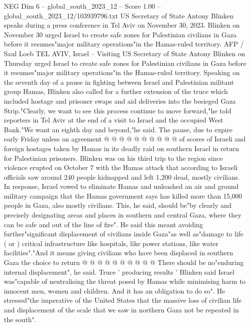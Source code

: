 \begin{textsample}{NEG Dim 6 – global\_south\_2023\_12 – Score 1.00 – global\_south\_2023\_12/103939796.txt}  \label{ex:f6_neg_317}
US Secretary of State Antony Blinken speaks during a press conference in Tel Aviv on November 30, 2023.
Blinken on November 30 urged Israel to create safe zones for Palestinian civilians in Gaza before it resumes"major military operations"in the Hamas-ruled territory.
AFP / Saul Loeb TEL AVIV, Israel -- Visiting US Secretary of State Antony Blinken on Thursday urged Israel to create safe zones for Palestinian civilians in Gaza before it resumes"major military operations"in the Hamas-ruled territory.
Speaking on the seventh day of a pause in fighting between Israel and Palestinian militant group Hamas, Blinken also called for a further extension of the truce which included hostage and prisoner swaps and aid deliveries into the besieged Gaza Strip."Clearly, we want to see this process continue to move forward,"he told reporters in Tel Aviv at the end of a visit to Israel and the occupied West Bank."We want an eighth day and beyond,"he said.
The pause, due to expire early Friday unless an agreement @ @ @ @ @ @ @ @ @ @ of scores of Israeli and foreign hostages taken by Hamas in its deadly raid on southern Israel in return for Palestinian prisoners.
Blinken was on his third trip to the region since violence erupted on October 7 with the Hamas attack that according to Israeli officials saw around 240 people kidnapped and left 1,200 dead, mostly civilians.
In response, Israel vowed to eliminate Hamas and unleashed an air and ground military campaign that the Hamas government says has killed more than 15,000 people in Gaza, also mostly civilians.
This, he said, should be"by clearly and precisely designating areas and places in southern and central Gaza, where they can be safe and out of the line of fire".
He said this meant avoiding further"significant displacement of civilians inside Gaza"as well as"damage to life ( or ) critical infrastructure like hospitals, like power stations, like water facilities"."And it means giving civilians who have been displaced in southern Gaza the choice to return @ @ @ @ @ @ @ @ @ @ There should be no"enduring internal displacement", he said.
Truce ' producing results ' Blinken said Israel was"capable of neutralising the threat posed by Hamas while minimising harm to innocent men, women and children.
And it has an obligation to do so".
He stressed"the imperative of the United States that the massive loss of civilian life and displacement of the scale that we saw in northern Gaza not be repeated in the south".

\end{textsample}

